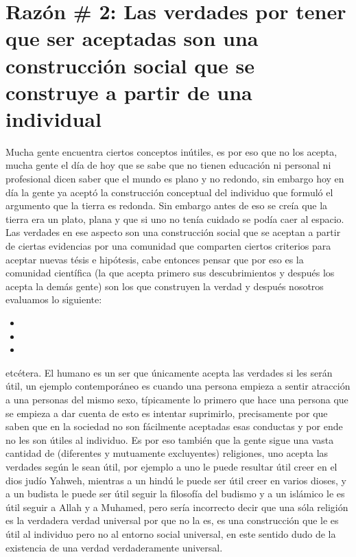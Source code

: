 \documentclass{article}
\begin{document}
\section{Razón \# 2: Las verdades por tener que ser aceptadas son una construcción social que se construye a partir de una individual}
Mucha gente encuentra ciertos conceptos inútiles, es por eso que no los acepta, mucha gente el día de hoy que se sabe que no tienen educación ni personal ni profesional dicen saber que el mundo es plano y no redondo, sin embargo hoy en día la gente ya aceptó la construcción conceptual del individuo que formuló el argumento que la tierra es redonda. 
Sin embargo antes de eso se creía que la tierra era un plato, plana y que si uno no tenía cuidado se podía caer al espacio. 
Las verdades en ese aspecto son una construcción social que se aceptan a partir de ciertas evidencias por una comunidad que comparten ciertos criterios para aceptar nuevas tésis e hipótesis, cabe entonces pensar que por eso es la comunidad científica (la que acepta primero sus descubrimientos y después los acepta la demás gente) son los que construyen la verdad y después nosotros evaluamos lo siguiente: \begin{itemize}
    \item {} 
    \item {}   
    \item {} 
\end{itemize} etcétera.
El humano es un ser que únicamente acepta las verdades si les serán útil, un ejemplo contemporáneo es cuando una persona empieza a sentir atracción a una personas del mismo sexo, típicamente lo primero que hace una persona que se empieza a dar cuenta de esto es intentar suprimirlo,  precisamente por que saben que en la sociedad no son fácilmente aceptadas esas conductas y por ende no les son útiles al individuo. Es por eso también que la gente sigue una vasta cantidad de (diferentes y mutuamente excluyentes) religiones, uno acepta las verdades según le sean útil, por ejemplo a uno le puede resultar útil creer en el dios judío Yahweh, mientras a un hindú le puede ser útil creer en varios dioses, y a un budista le puede ser útil seguir la filosofía del budismo y a un islámico le es útil seguir a Allah y a Muhamed, pero sería incorrecto decir que una sóla religión es la verdadera verdad universal por que no la es, es una construcción que le es útil al individuo pero no al entorno social universal, en este sentido dudo de la existencia de una verdad verdaderamente universal. 
\end{document}
